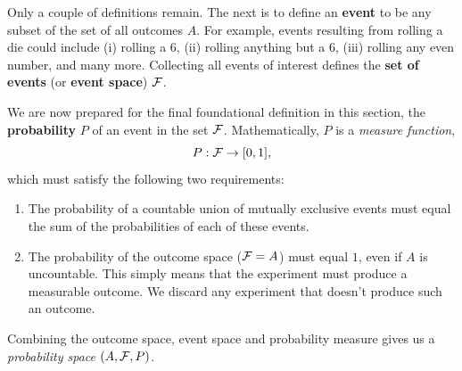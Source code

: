 Only a couple of definitions remain.
The next is to define an \textbf{event} to be any subset of the set of all outcomes $A$.
For example, events resulting from rolling a die could include (i) rolling a $6$, (ii) rolling anything but a $6$, (iii) rolling any even number, and many more.
Collecting all events of interest defines the \textbf{set of events} (or \textbf{event space}) $\mathcal F$.

We are now prepared for the final foundational definition in this section, the \textbf{probability} $P$ of an event in the set $\mathcal F$.
Mathematically, $P$ is a \textit{measure function},
\begin{equation*}
  P: \mathcal F \to [0, 1],
\end{equation*}
which must satisfy the following two requirements: \\[-24 pt]
\begin{enumerate}
  \item The probability of a countable union of mutually exclusive events must equal the sum of the probabilities of each of these events.
  \item The probability of the outcome space ($\mathcal F = A$) must equal $1$, even if $A$ is uncountable.
        This simply means that the experiment \cE must produce a measurable outcome.
        We discard any experiment that doesn't produce such an outcome. \\[-24 pt]
\end{enumerate}
Combining the outcome space, event space and probability measure gives us a \textit{probability space} $(A, \mathcal F, P)$.

